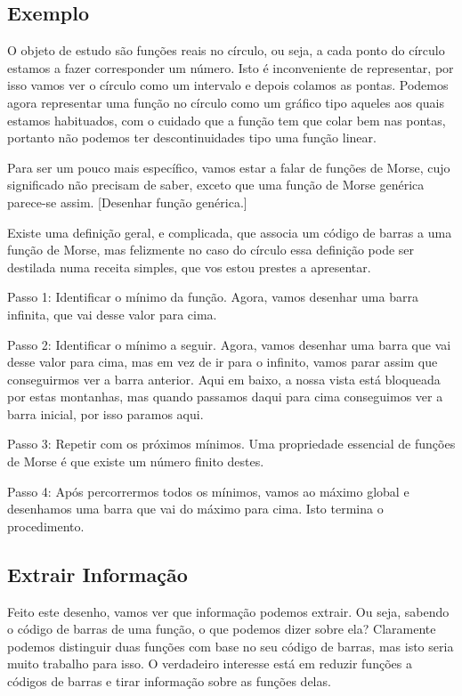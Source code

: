 \documentclass{article}
\theoremstyle{nonumberplain}
\begin{document}
\subsection{Exemplo}

O objeto de estudo são funções reais no círculo, ou seja, a cada ponto do círculo estamos a fazer corresponder um número. Isto é inconveniente de representar, por isso vamos ver o círculo como um intervalo e depois colamos as pontas. Podemos agora representar uma função no círculo como um gráfico tipo aqueles aos quais estamos habituados, com o cuidado que a função tem que colar bem nas pontas, portanto não podemos ter descontinuidades tipo uma função linear.

Para ser um pouco mais específico, vamos estar a falar de funções de Morse, cujo significado não precisam de saber, exceto que uma função de Morse genérica parece-se assim. [Desenhar função genérica.]

Existe uma definição geral, e complicada, que associa um código de barras a uma função de Morse, mas felizmente no caso do círculo essa definição pode ser destilada numa receita simples, que vos estou prestes a apresentar.

Passo 1: Identificar o mínimo da função. Agora, vamos desenhar uma barra infinita, que vai desse valor para cima.

Passo 2: Identificar o mínimo a seguir. Agora, vamos desenhar uma barra que vai desse valor para cima, mas em vez de ir para o infinito, vamos parar assim que conseguirmos ver a barra anterior. Aqui em baixo, a nossa vista está bloqueada por estas montanhas, mas quando passamos daqui para cima conseguimos ver a barra inicial, por isso paramos aqui.

Passo 3: Repetir com os próximos mínimos. Uma propriedade essencial de funções de Morse é que existe um número finito destes.

Passo 4: Após percorrermos todos os mínimos, vamos ao máximo global e desenhamos uma barra que vai do máximo para cima. Isto termina o procedimento.



\subsection{Extrair Informação}

Feito este desenho, vamos ver que informação podemos extrair. Ou seja, sabendo o código de barras de uma função, o que podemos dizer sobre ela? Claramente podemos distinguir duas funções com base no seu código de barras, mas isto seria muito trabalho para isso. O verdadeiro interesse está em reduzir funções a códigos de barras e tirar informação sobre as funções delas.
\end{document}
